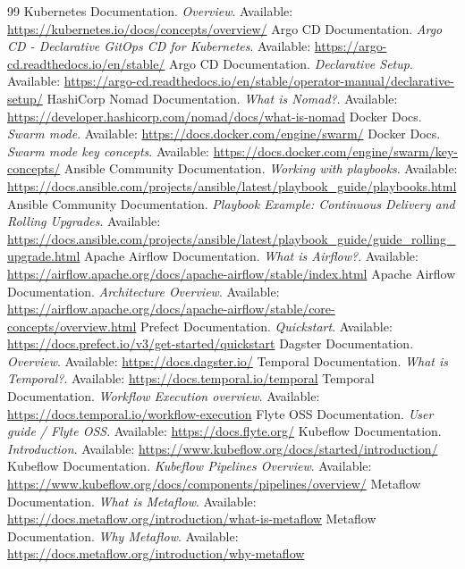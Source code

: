 \documentclass[10pt]{article}
\begin{document}
\begin{thebibliography}{99}
 Kubernetes Documentation. \emph{Overview}. Available: \url{https://kubernetes.io/docs/concepts/overview/}
 Argo CD Documentation. \emph{Argo CD - Declarative GitOps CD for Kubernetes}. Available: \url{https://argo-cd.readthedocs.io/en/stable/}
 Argo CD Documentation. \emph{Declarative Setup}. Available: \url{https://argo-cd.readthedocs.io/en/stable/operator-manual/declarative-setup/}
 HashiCorp Nomad Documentation. \emph{What is Nomad?}. Available: \url{https://developer.hashicorp.com/nomad/docs/what-is-nomad}
 Docker Docs. \emph{Swarm mode}. Available: \url{https://docs.docker.com/engine/swarm/}
 Docker Docs. \emph{Swarm mode key concepts}. Available: \url{https://docs.docker.com/engine/swarm/key-concepts/}
 Ansible Community Documentation. \emph{Working with playbooks}. Available: \url{https://docs.ansible.com/projects/ansible/latest/playbook_guide/playbooks.html}
 Ansible Community Documentation. \emph{Playbook Example: Continuous Delivery and Rolling Upgrades}. Available: \url{https://docs.ansible.com/projects/ansible/latest/playbook_guide/guide_rolling_upgrade.html}
 Apache Airflow Documentation. \emph{What is Airflow?}. Available: \url{https://airflow.apache.org/docs/apache-airflow/stable/index.html}
 Apache Airflow Documentation. \emph{Architecture Overview}. Available: \url{https://airflow.apache.org/docs/apache-airflow/stable/core-concepts/overview.html}
 Prefect Documentation. \emph{Quickstart}. Available: \url{https://docs.prefect.io/v3/get-started/quickstart}
 Dagster Documentation. \emph{Overview}. Available: \url{https://docs.dagster.io/}
 Temporal Documentation. \emph{What is Temporal?}. Available: \url{https://docs.temporal.io/temporal}
 Temporal Documentation. \emph{Workflow Execution overview}. Available: \url{https://docs.temporal.io/workflow-execution}
 Flyte OSS Documentation. \emph{User guide / Flyte OSS}. Available: \url{https://docs.flyte.org/}
 Kubeflow Documentation. \emph{Introduction}. Available: \url{https://www.kubeflow.org/docs/started/introduction/}
 Kubeflow Documentation. \emph{Kubeflow Pipelines Overview}. Available: \url{https://www.kubeflow.org/docs/components/pipelines/overview/}
 Metaflow Documentation. \emph{What is Metaflow}. Available: \url{https://docs.metaflow.org/introduction/what-is-metaflow}
 Metaflow Documentation. \emph{Why Metaflow}. Available: \url{https://docs.metaflow.org/introduction/why-metaflow}
\end{thebibliography}
\end{document}
